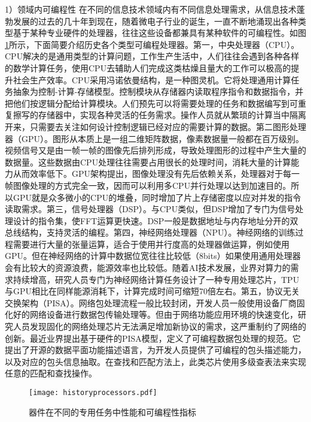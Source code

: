 
1）领域内可编程性
在不同的信息技术领域内有不同信息处理需求，从信息技术蓬勃发展的过去的几十年到现在，随着微电子行业的诞生，一直不断地涌现出各种类型基于某种专业硬件的处理器，往往这些设备都兼具有某种软件的可编程性。如图\ref{fig:historyprocessors}所示，下面简要介绍历史各个类型可编程处理器。第一，中央处理器（CPU）。CPU解决的是通用类型的计算问题，工作生产生活中，人们往往会遇到各种各样的数学计算任务，使用CPU去辅助人们完成这类枯燥且量大的工作可以极高的提升社会生产效率。CPU采用冯诺依曼结构，是一种图灵机。它将处理通用计算任务抽象为控制-计算-存储模型。控制模块从存储器内读取程序指令和数据指令，并把他们按逻辑分配给计算模块。人们预先可以将需要处理的任务和数据编写到可重复擦写的存储器中，实现各种灵活的任务需求。操作人员就从繁琐的计算当中隔离开来，只需要去关注如何设计控制逻辑已经对应的需要计算的数据。第二图形处理器（GPU）。图形从本质上是一组二维矩阵数据，像素数据量一般都在百万级别。视频信号又是由一帧一帧的图像先后排列形成，导致处理图形的过程中产生大量的数据量。这些数据由CPU处理往往需要占用很长的处理时间，消耗大量的计算能力从而效率低下。GPU架构提出，图像处理没有先后依赖关系，处理器对于每一帧图像处理的方式完全一致，因而可以利用多CPU并行处理以达到加速目的。所以GPU就是众多微小的CPU的堆叠，同时增加了片上存储密度以应对并发的指令读取需求。第三，信号处理器（DSP）。与CPU类似，但DSP增加了专门为信号处理设计的指令集，使FFT运算更快速。DSP一般是数据地址与内存地址分开的双总线结构，支持灵活的编程。第四，神经网络处理器（NPU）。神经网络的训练过程需要进行大量的张量运算，适合于使用并行度高的处理器做运算，例如使用GPU。但在神经网络的计算中数据位宽往往比较低（8bits）如果使用通用处理器会有比较大的资源浪费，能源效率也比较低。随着AI技术发展，业界对算力的需求持续增高，研究人员专门为神经网络计算任务设计了一种专用处理芯片，TPU与GPU相比在同样能源消耗下，计算完成时间可缩短70倍左右。第五，协议无关交换架构（PISA）。网络包处理流程一般比较封闭，开发人员一般使用设备厂商固化好的网络设备进行数据包传输处理等。但由于网络功能应用环境的快速变化，研究人员发现固化的网络处理芯片无法满足增加新协议的需求，这严重制约了网络的创新。最近业界提出基于硬件的PISA模型，定义了可编程数据包处理的规范。它提出了开源的数据平面功能描述语言，为开发人员提供了可编程的包头描述能力，以及对应的包头信息抽取。在查找和匹配方法上，此类芯片使用多级查表法来实现任意的匹配和查找操作。

\begin{figure}[!ht]
	\centering
	\texttt{[image: historyprocessors.pdf]}
	\caption{器件在不同的专用任务中性能和可编程性指标} \label{fig:historyprocessors}
\end{figure}

